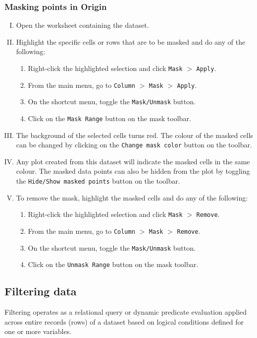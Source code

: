 		\subsubsection{Masking points in Origin}
			\begin{enumerate}[I.]
				\item Open the worksheet containing the dataset.
				
				\item Highlight the specific cells or rows that are to be masked and do any of the following:
				\begin{enumerate}
					\item Right-click the highlighted selection and click \verb|Mask| $>$ \verb|Apply|.
					\item From the main menu, go to \verb|Column| $>$ \verb|Mask| $>$ \verb|Apply|.
					\item On the shortcut menu, toggle the \verb|Mask/Unmask| button.
					\item Click on the \verb|Mask Range| button on the mask toolbar.
				\end{enumerate}
				
				\item The background of the selected cells turns red. The colour of the masked cells can be changed by clicking on the \verb|Change mask color| button on the toolbar.
				
				\item Any plot created from this dataset will indicate the masked cells in the same colour. The masked data points can also be hidden from the plot by toggling the \verb|Hide/Show masked points| button on the toolbar.
				
				\item To remove the mask, highlight the masked cells and do any of the following:
				\begin{enumerate}
					\item Right-click the highlighted selection and click \verb|Mask| $>$ \verb|Remove|.
					\item From the main menu, go to \verb|Column| $>$ \verb|Mask| $>$ \verb|Remove|.
					\item On the shortcut menu, toggle the \verb|Mask/Unmask| button.
					\item Click on the \verb|Unmask Range| button on the mask toolbar.
				\end{enumerate}
			\end{enumerate}
	
	\subsection{Filtering data}
		Filtering operates as a relational query or dynamic predicate evaluation applied across entire records (rows) of a dataset based on logical conditions defined for one or more variables.
		
